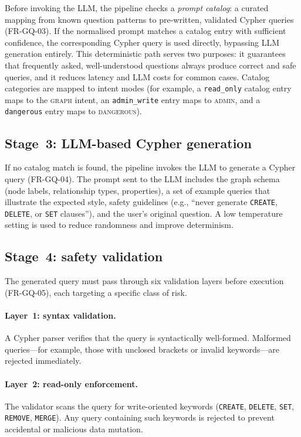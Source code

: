 \documentclass[a4paper,noexaminfo]{sapthesis}
\begin{document}
Before invoking the LLM, the pipeline checks a \emph{prompt catalog}: a
curated mapping from known question patterns to pre-written, validated
Cypher queries (FR-GQ-03).  If the normalised prompt matches a catalog
entry with sufficient confidence, the corresponding Cypher query is used
directly, bypassing LLM generation entirely.  This deterministic path
serves two purposes: it guarantees that frequently asked, well-understood
questions always produce correct and safe queries, and it reduces latency
and LLM costs for common cases.  Catalog categories are mapped to intent
modes (for example, a \texttt{read\_only} catalog entry maps to the
\textsc{graph} intent, an \texttt{admin\_write} entry maps to
\textsc{admin}, and a \texttt{dangerous} entry maps to \textsc{dangerous}).

\subsection{Stage~3: LLM-based Cypher generation}

If no catalog match is found, the pipeline invokes the LLM to generate a
Cypher query (FR-GQ-04).  The prompt sent to the LLM includes the graph
schema (node labels, relationship types, properties), a set of example
queries that illustrate the expected style, safety guidelines (e.g.,
``never generate \texttt{CREATE}, \texttt{DELETE}, or \texttt{SET}
clauses''), and the user's original question.  A low temperature
setting is used to reduce randomness and improve determinism.

\subsection{Stage~4: safety validation}

The generated query must pass through six validation layers before
execution (FR-GQ-05), each targeting a specific class of risk.

\paragraph{Layer~1: syntax validation.}
A Cypher parser verifies that the query is syntactically well-formed.
Malformed queries---for example, those with unclosed brackets or invalid
keywords---are rejected immediately.

\paragraph{Layer~2: read-only enforcement.}
The validator scans the query for write-oriented keywords
(\texttt{CREATE}, \texttt{DELETE}, \texttt{SET}, \texttt{REMOVE},
\texttt{MERGE}).  Any query containing such keywords is rejected to
prevent accidental or malicious data mutation.
\end{document}
